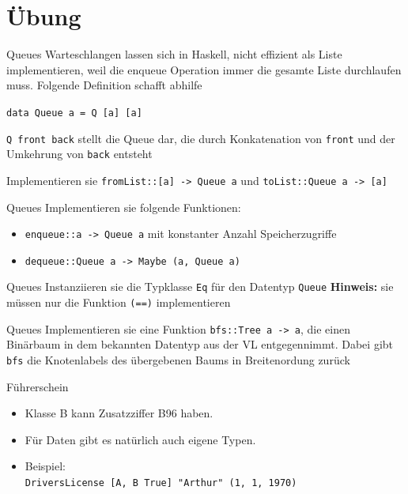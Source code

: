 \documentclass{beamer}
\begin{document}
\section{Übung}

\begin{frame}{Queues}
  Warteschlangen lassen sich in Haskell, nicht effizient als Liste implementieren, weil die enqueue Operation immer die gesamte Liste durchlaufen muss. Folgende Definition schafft abhilfe
  
  \texttt{data Queue a = Q [a] [a]}

  \texttt{Q front back} stellt die Queue dar, die durch Konkatenation von \texttt{front} und der Umkehrung von \texttt{back} entsteht

  Implementieren sie \texttt{fromList::[a] -> Queue a} und \texttt{toList::Queue a -> [a]}
\end{frame}

\begin{frame}{Queues}
    Implementieren sie folgende Funktionen:
    \begin{itemize}
        \item \texttt{enqueue::a -> Queue a} mit konstanter Anzahl Speicherzugriffe
        \item \texttt{dequeue::Queue a -> Maybe (a, Queue a)}
    \end{itemize}
\end{frame}

\begin{frame}{Queues}
    Instanziieren sie die Typklasse \texttt{Eq} für den Datentyp \texttt{Queue}
    \textbf{Hinweis:} sie müssen nur die Funktion \texttt{(==)} implementieren
\end{frame}

\begin{frame}{Queues}
    Implementieren sie eine Funktion \texttt{bfs::Tree a -> a}, die einen Binärbaum in dem bekannten Datentyp aus der VL entgegennimmt. Dabei gibt \texttt{bfs} die Knotenlabels des übergebenen Baums in Breitenordung zurück
    
\end{frame}

\begin{frame}{Führerschein}

  \vfill

  \begin{itemize}
    \item Klasse B kann Zusatzziffer B96 haben.
    \item Für Daten gibt es natürlich auch eigene Typen.
    \item Beispiel:\\
          \texttt{DriversLicense [A, B True] "{}Arthur"{} (1, 1, 1970)}
  \end{itemize}
\end{frame}
\end{document}
